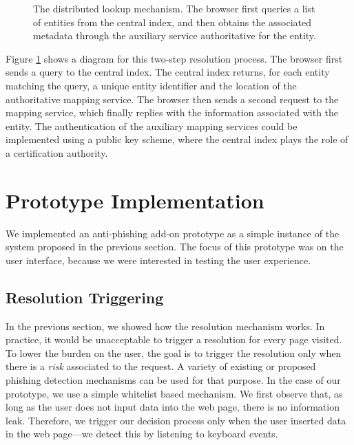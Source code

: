 \documentclass[11pt,styles/chicago,a4paper]{article}
\begin{document}
\begin{figure}[t]
  \caption{The distributed lookup mechanism. The browser first queries a list of entities from the central index, and then obtains the associated metadata through the auxiliary service authoritative for the entity.}
  \label{fig:distriblkp}
\end{figure}

Figure \ref{fig:distriblkp} shows a diagram for this two-step resolution process. The browser first sends a query to the central index. The central index returns, for each entity matching the query, a unique entity identifier and the location of the authoritative mapping service. The browser then sends a second request to the mapping service, which finally replies with the information associated with the entity. The authentication of the auxiliary mapping services could be implemented using a public key scheme, where the central index plays the role of a certification authority.

\section{Prototype Implementation} %

We implemented an anti-phishing add-on prototype as a simple instance of the system proposed in the previous section. The focus of this prototype was on the user interface, because we were interested in testing the user experience.

\subsection{Resolution Triggering}

In the previous section, we showed how the resolution mechanism works. In practice, it would be unacceptable to trigger a resolution for every page visited. To lower the burden on the user, the goal is to trigger the resolution only when there is a \emph{risk} associated to the request. A variety of existing or proposed phishing detection mechanisms can be used for that purpose. In the case of our prototype, we use a simple whitelist based mechanism. We first observe that, as long as the user does not input data into the web page, there is no information leak. Therefore, we trigger our decision process only when the user inserted data in the web page---we detect this by listening to keyboard events.
\end{document}
